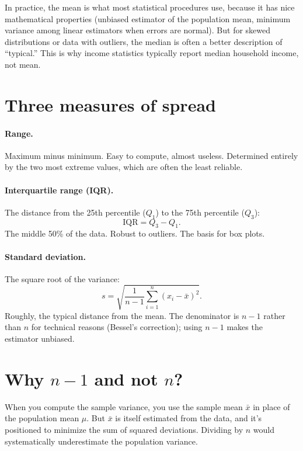 In practice, the mean is what most statistical procedures use, because it has nice mathematical properties (unbiased estimator of the population mean, minimum variance among linear estimators when errors are normal). But for skewed distributions or data with outliers, the median is often a better description of ``typical.'' This is why income statistics typically report median household income, not mean.

\section{Three measures of spread}

\paragraph{Range.} Maximum minus minimum. Easy to compute, almost useless. Determined entirely by the two most extreme values, which are often the least reliable.

\paragraph{Interquartile range (IQR).} The distance from the 25th percentile ($Q_1$) to the 75th percentile ($Q_3$):
\[
  \text{IQR} = Q_3 - Q_1.
\]
The middle 50\% of the data. Robust to outliers. The basis for box plots.

\paragraph{Standard deviation.} The square root of the variance:
\begin{equation}
  s = \sqrt{\frac{1}{n-1}\sum_{i=1}^{n}(x_i - \bar{x})^2}.
  \label{eq:sample-sd}
\end{equation}
Roughly, the typical distance from the mean. The denominator is $n-1$ rather than $n$ for technical reasons (Bessel's correction); using $n-1$ makes the estimator unbiased.

\section{Why $n-1$ and not $n$?}

When you compute the sample variance, you use the sample mean $\bar{x}$ in place of the population mean $\mu$. But $\bar{x}$ is itself estimated from the data, and it's positioned to minimize the sum of squared deviations. Dividing by $n$ would systematically underestimate the population variance.

